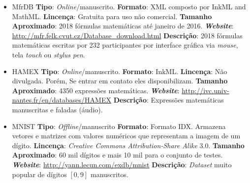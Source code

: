 \begin{itemize}
	\item MfrDB \cite{stria2012mfrdb}
	\subitem \textbf{Tipo}: \textit{Online}/manuscrito.
	\subitem \textbf{Formato}: XML composto por InkML and MathML.
	\subitem \textbf{Lincença}: Gratuita para uso não comercial.
	\subitem \textbf{Tamanho Aproximado}: 2018 fórmulas matemáticas até janeiro de 2016.
	\subitem \textit{\textbf{Website}}: \url{http://mfr.felk.cvut.cz/Database_download.html}
	\subitem \textbf{Descrição}: 2018 fórmulas matemáticas escritas por 232 participantes por interface gráfica via \textit{mouse}, tela \textit{touch} ou \textit{stylus pen}.
	
	
	\item HAMEX \cite{quiniou2011hamex}
	\subitem \textbf{Tipo}: \textit{Online}/manuscrito.
	\subitem \textbf{Formato}: InkML.
	\subitem \textbf{Lincença}: Não divulgada. Porém, Se entrar em contato eles disponibilizam.
	\subitem \textbf{Tamanho Aproximado}: 4350 expressões matemáticas.
	\subitem \textit{\textbf{Website}}: \url{http://ivc.univ-nantes.fr/en/databases/HAMEX}
	\subitem \textbf{Descrição}: Expressões matemáticas manuscritas e faladas (áudio).
	
	\item MNIST \cite{lecun1998gradient}
	\subitem \textbf{Tipo}: \textit{Offline}/manuscrito
	\subitem \textbf{Formato}: Formato IDX. Armazena vetores e matrizes com valores numéricos que representam a imagem de um dígito.
	\subitem \textbf{Lincença}: \textit{Creative Commons Attribution-Share Alike} 3.0.
	\subitem \textbf{Tamanho Aproximado}: 60 mil dígitos e mais 10 mil para o conjunto de testes.
	\subitem \textit{\textbf{Website}}: \url{http://yann.lecun.com/exdb/mnist}
	\subitem \textbf{Descrição}: \textit{Dataset} muito popular de dígitos $[0,9]$ manuscritos.
	
	

\end{itemize}
